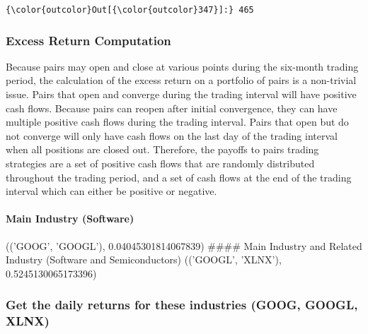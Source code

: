 \documentclass[11pt]{article}
\begin{document}
\begin{Verbatim}[commandchars=\\\{\}]
{\color{outcolor}Out[{\color{outcolor}347}]:} 465
\end{Verbatim}
            
    \subsubsection{Excess Return
Computation}\label{excess-return-computation}

Because pairs may open and close at various points during the six-month
trading period, the calculation of the excess return on a portfolio of
pairs is a non-trivial issue. Pairs that open and converge during the
trading interval will have positive cash flows. Because pairs can reopen
after initial convergence, they can have multiple positive cash flows
during the trading interval. Pairs that open but do not converge will
only have cash flows on the last day of the trading interval when all
positions are closed out. Therefore, the payoffs to pairs trading
strategies are a set of positive cash flows that are randomly
distributed throughout the trading period, and a set of cash flows at
the end of the trading interval which can either be positive or
negative.

    \paragraph{Main Industry (Software)}\label{main-industry-software}

(('GOOG', 'GOOGL'), 0.04045301814067839) \#\#\#\# Main Industry and
Related Industry (Software and Semiconductors) (('GOOGL', 'XLNX'),
0.5245130065173396)

    \subsubsection{Get the daily returns for these industries (GOOG, GOOGL,
XLNX)}\label{get-the-daily-returns-for-these-industries-goog-googl-xlnx}
\end{document}
